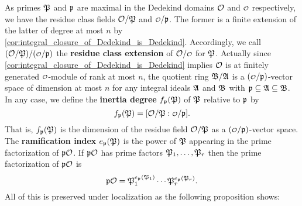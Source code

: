     \begin{center}
    \end{center}

    As primes $\mathfrak{P}$ and $\mathfrak{p}$ are maximal in the Dedekind domains $\mathcal{O}$ and $\smc{O}$ respectively, we have the residue class fields $\mathcal{O}/\mathfrak{P}$ and $\smc{O}/\mf{p}$. The former is a finite extension of the latter of degree at most $n$ by \cref{cor:integral_closure_of_Dedekind_is_Dedekind}. Accordingly, we call $(\mc{O}/\mf{P})/(\smc{O}/\mf{p})$ the \textbf{residue class extension} of $\mc{O}/\smc{O}$ for $\mathfrak{P}$. Actually since \cref{cor:integral_closure_of_Dedekind_is_Dedekind} implies $\mathcal{O}$ is at finitely generated $\smc{O}$-module of rank at most $n$, the quotient ring $\mathfrak{B}/\mathfrak{A}$ is a $(\smc{O}/\mf{p})$-vector space of dimension at most $n$ for any integral ideals $\mathfrak{A}$ and $\mathfrak{B}$ with $\mathfrak{p} \subseteq \mathfrak{A} \subseteq \mathfrak{B}$. In any case, we define the \textbf{inertia degree} $f_{\mathfrak{p}}(\mathfrak{P})$ of $\mathfrak{P}$ relative to $\mathfrak{p}$ by
    \[
      f_{\mf{p}}(\mf{P}) = [\mc{O}/\mf{P}:\smc{O}/\mf{p}].
    \]
    That is, $f_{\mathfrak{p}}(\mathfrak{P})$ is the dimension of the residue field $\mathcal{O}/\mathfrak{P}$ as a $(\smc{O}/\mf{p})$-vector space. The \textbf{ramification index} $e_{\mathfrak{p}}(\mathfrak{P})$ is the power of $\mathfrak{P}$ appearing in the prime factorization of $\mathfrak{p}\mathcal{O}$. If $\mathfrak{p}\mathcal{O}$ has prime factors $\mathfrak{P}_{1},\ldots,\mathfrak{P}_{r}$ then the prime factorization of $\mathfrak{p}\mathcal{O}$ is
    \[
      \mathfrak{p}\mathcal{O} = \mathfrak{P}_{1}^{e_{\mathfrak{p}}(\mathfrak{P}_{1})} \cdots \mathfrak{P}_{r}^{e_{\mathfrak{p}}(\mathfrak{P}_{r})}.
    \]
    All of this is preserved under localization as the following proposition shows:

